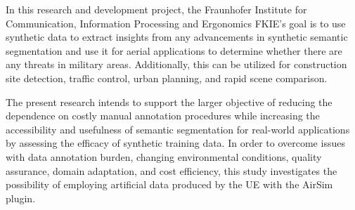 \documentclass[../report.tex]{subfiles}
\begin{document}




    
    In this research and development project, the Fraunhofer Institute for Communication, Information Processing and Ergonomics FKIE's goal is to use synthetic data to extract insights from any advancements in synthetic semantic segmentation and use it for aerial applications to determine whether there are any threats in military areas. Additionally, this can be utilized for construction site detection, traffic control, urban planning, and rapid scene comparison.
    
    
    
    The present research intends to support the larger objective of reducing the dependence on costly manual annotation procedures while increasing the accessibility and usefulness of semantic segmentation for real-world applications by assessing the efficacy of synthetic training data. In order to overcome issues with data annotation burden, changing environmental conditions, quality assurance, domain adaptation, and cost efficiency, this study investigates the possibility of employing artificial data produced by the UE with the AirSim plugin.  
\end{document}
